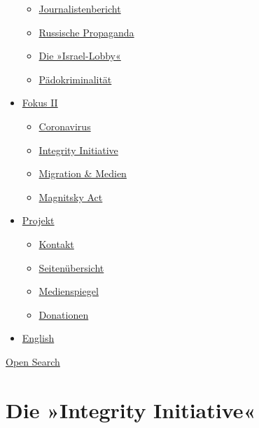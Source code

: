 \begin{itemize}
  \begin{itemize}
  \tightlist
  \item
    \href{https://swprs.org/bericht-eines-journalisten/}{Journalistenbericht}
  \item
    \href{https://swprs.org/russische-propaganda/}{Russische Propaganda}
  \item
    \href{https://swprs.org/die-israel-lobby-fakten-und-mythen/}{Die
    »Israel-Lobby«}
  \item
    \href{https://swprs.org/geopolitik-und-paedokriminalitaet/}{Pädokriminalität}
  \end{itemize}
\item
  \href{https://swprs.org/migration-und-medien/}{Fokus II}

  \begin{itemize}
  \tightlist
  \item
    \href{https://swprs.org/covid-19-hinweis-ii/}{Coronavirus}
  \item
    \href{https://swprs.org/die-integrity-initiative/}{Integrity
    Initiative}
  \item
    \href{https://swprs.org/migration-und-medien/}{Migration \& Medien}
  \item
    \href{https://swprs.org/der-fall-magnitsky/}{Magnitsky Act}
  \end{itemize}
\item
  \href{https://swprs.org/kontakt/}{Projekt}

  \begin{itemize}
  \tightlist
  \item
    \href{https://swprs.org/kontakt/}{Kontakt}
  \item
    \href{https://swprs.org/uebersicht/}{Seitenübersicht}
  \item
    \href{https://swprs.org/medienspiegel/}{Medienspiegel}
  \item
    \href{https://swprs.org/donationen/}{Donationen}
  \end{itemize}
\item
  \href{https://swprs.org/contact/}{English}
\end{itemize}

\protect\hyperlink{}{Open Search}

\hypertarget{die-integrity-initiative}{%
\section{Die »Integrity Initiative«}\label{die-integrity-initiative}}

